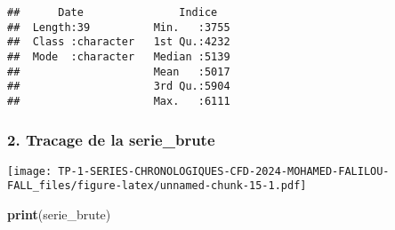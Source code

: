 \documentclass[
]{article}
\newenvironment{Shaded}{\begin{snugshade}}{\end{snugshade}}
\newcommand{\AttributeTok}[1]{\textcolor[rgb]{0.13,0.29,0.53}{#1}}
\newcommand{\DecValTok}[1]{\textcolor[rgb]{0.00,0.00,0.81}{#1}}
\newcommand{\FunctionTok}[1]{\textcolor[rgb]{0.13,0.29,0.53}{\textbf{#1}}}
\newcommand{\NormalTok}[1]{#1}
\newcommand{\OtherTok}[1]{\textcolor[rgb]{0.56,0.35,0.01}{#1}}
\newcommand{\SpecialCharTok}[1]{\textcolor[rgb]{0.81,0.36,0.00}{\textbf{#1}}}
\newcommand{\StringTok}[1]{\textcolor[rgb]{0.31,0.60,0.02}{#1}}
\begin{document}
\begin{verbatim}
##      Date               Indice    
##  Length:39          Min.   :3755  
##  Class :character   1st Qu.:4232  
##  Mode  :character   Median :5139  
##                     Mean   :5017  
##                     3rd Qu.:5904  
##                     Max.   :6111
\end{verbatim}

\subsubsection{2. Tracage de la
serie\_brute}\label{tracage-de-la-serie_brute}

\begin{Shaded}
\end{Shaded}

\texttt{[image: TP-1-SERIES-CHRONOLOGIQUES-CFD-2024-MOHAMED-FALILOU-FALL\_files/figure-latex/unnamed-chunk-15-1.pdf]}

\begin{Shaded}
\begin{Highlighting}[]
\FunctionTok{print}\NormalTok{(serie\_brute)}
\end{Highlighting}
\end{Shaded}
\end{document}
